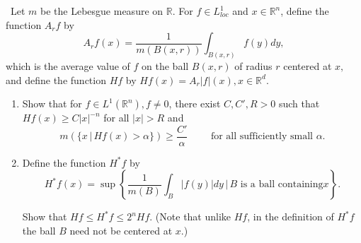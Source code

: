 \documentclass[12pt]{Qual}
\begin{document}
\begin{problem} $\,$
Let $m$ be the Lebesgue measure on $\mathbb{R}$. For $f\in L_{loc}^1$ and $x\in\mathbb{R}^n$, define the function $A_rf$ by $$A_rf(x)=\frac{1}{m(B(x,r))}\int_{B(x,r)}f(y)dy,$$ which is the average value of $f$ on the ball $B(x,r)$ of radius $r$ centered at $x,$ and define the function $Hf$ by $Hf(x)=A_r|f|(x),x\in\mathbb{R}^d.$
\begin{enumerate}[label=(\alph*)]
    \item Show that for $f\in L^1(\mathbb{R}^n),f\not=0$, there exist $C,C',R>0$ such that $Hf(x)\ge C|x|^{-n}$ for all $|x|>R$ and $$m\left(\{x\,|\,Hf(x)>\alpha\}\right)\ge\frac{C'}{\alpha}\qquad\text{ for all sufficiently small }\alpha.$$
    \item Define the function $H^*f$ by $$H^*f(x)=\sup\left\{\frac{1}{m(B)}\int_B|f(y)|dy\,\bigg|\, B\text{ is a ball containing}x\right\}.$$

Show that $Hf\le H^*f\le 2^nHf$. (Note that unlike $Hf$, in the definition of $H^*f$ the ball $B$ need not be centered at $x$.)
\end{enumerate}
\end{problem}
\end{document}
